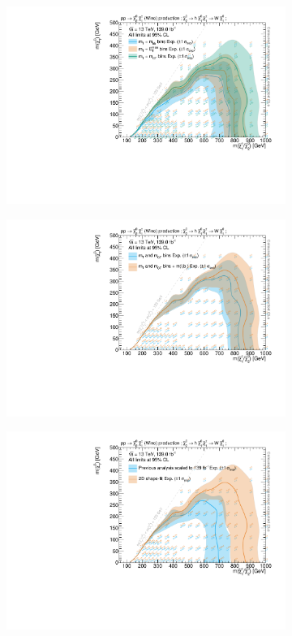 \begin{figure}
	\centering
	\begin{subfigure}[b]{0.5\linewidth}
		\centering\includegraphics[width=1.0\textwidth]{HF/plot_binnings_cls}
		\caption{\label{fig:plot_binnings_cls}}
	\end{subfigure}\hfill
	\begin{subfigure}[b]{0.5\linewidth}
		\centering\includegraphics[width=1.0\textwidth]{HF/plot_mlb1_cls}
		\caption{\label{fig:plot_mlb1_cls}}
	\end{subfigure}\hfill
	\begin{subfigure}[b]{0.5\linewidth}
		\centering\includegraphics[width=1.0\textwidth]{HF/plot_2d_shapefit_cls}

\end{subfigure}
\end{figure}
